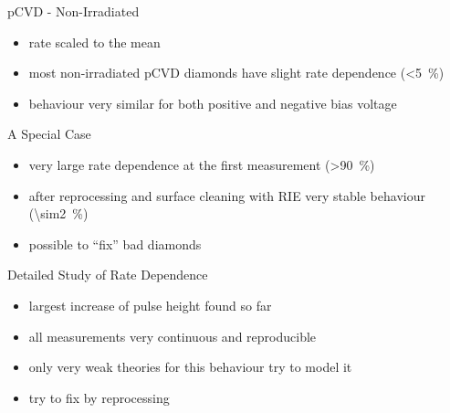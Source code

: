 \begin{frame}{pCVD - Non-Irradiated}
 
	
	
	\begin{itemize} \itemfill
		\item rate scaled to the mean
		\item most non-irradiated pCVD diamonds have slight rate dependence (\SI{<5}{\%})
		\item behaviour very similar for both positive and negative bias voltage
	\end{itemize}
 
\end{frame}
\begin{frame}{A Special Case}

	
	\begin{itemize}\itemfill
		\item very large rate dependence at the first measurement (\SI{>90}{\%})
		\item after reprocessing and surface cleaning with RIE very stable behaviour (\SI{\sim2}{\%})
		\item possible to ``fix'' bad diamonds
	\end{itemize}

\end{frame}
\begin{frame}{Detailed Study of Rate Dependence}

	\vspace*{-15pt}\vspace*{-5pt}
	
	\begin{itemize}\itemfill
		\item largest increase of pulse height found so far
		\item all measurements very continuous and reproducible
		\item only very weak theories for this behaviour \ra try to model it
		\item try to fix by reprocessing
	\end{itemize}

\end{frame}
